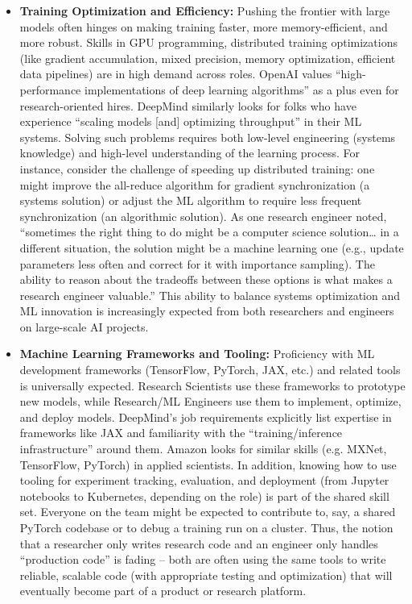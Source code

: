 \documentclass[pdflatex,sn-mathphys-num]{sn-jnl}%
\theoremstyle{thmstyleone}%
\theoremstyle{thmstyletwo}%
\theoremstyle{thmstylethree}%
\begin{document}
\begin{itemize}
\item \textbf{Training Optimization and Efficiency:} Pushing the frontier with large models often hinges on making training faster, more memory-efficient, and more robust. Skills in GPU programming, distributed training optimizations (like gradient accumulation, mixed precision, memory optimization, efficient data pipelines) are in high demand across roles. OpenAI values “high-performance implementations of deep learning algorithms” as a plus even for research-oriented hires\cite{OpenAI-RE-Job}. DeepMind similarly looks for folks who have experience “scaling models [and] optimizing throughput” in their ML systems\cite{DeepMind-RE-2025}. Solving such problems requires both low-level engineering (systems knowledge) and high-level understanding of the learning process. For instance, consider the challenge of speeding up distributed training: one might improve the all-reduce algorithm for gradient synchronization (a systems solution) or adjust the ML algorithm to require less frequent synchronization (an algorithmic solution). As one research engineer noted, “sometimes the right thing to do might be a computer science solution… in a different situation, the solution might be a machine learning one (e.g., update parameters less often and correct for it with importance sampling). The ability to reason about the tradeoffs between these options is what makes a research engineer valuable.”\cite{Matsukawa2019} This ability to balance systems optimization and ML innovation is increasingly expected from both researchers and engineers on large-scale AI projects. 



\item \textbf{Machine Learning Frameworks and Tooling:} Proficiency with ML development frameworks (TensorFlow, PyTorch, JAX, etc.) and related tools is universally expected. Research Scientists use these frameworks to prototype new models, while Research/ML Engineers use them to implement, optimize, and deploy models. DeepMind’s job requirements explicitly list expertise in frameworks like JAX and familiarity with the “training/inference infrastructure” around them\cite{DeepMind-RE-2025}. Amazon looks for similar skills (e.g. MXNet, TensorFlow, PyTorch) in applied scientists\cite{AIJobs-Applied-Ads-2023}. In addition, knowing how to use tooling for experiment tracking, evaluation, and deployment (from Jupyter notebooks to Kubernetes, depending on the role) is part of the shared skill set. Everyone on the team might be expected to contribute to, say, a shared PyTorch codebase or to debug a training run on a cluster. Thus, the notion that a researcher only writes research code and an engineer only handles “production code” is fading – both are often using the same tools to write reliable, scalable code (with appropriate testing and optimization) that will eventually become part of a product or research platform. 


\end{itemize}
\end{document}
